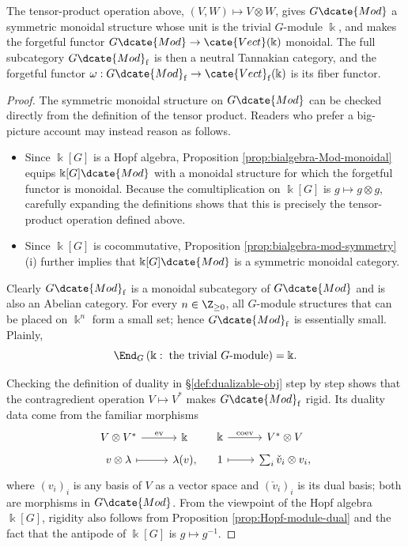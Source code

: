 \begin{proposition}\label{prop:RepG-Tannakian}
	The tensor-product operation above, $(V,W)\mapsto V\otimes W$, gives $G\dcate{Mod}$ a symmetric monoidal structure whose unit is the trivial $G$-module $\Bbbk$, and makes the forgetful functor $G\dcate{Mod}\to\cate{Vect}(\Bbbk)$ monoidal. The full subcategory $G\dcate{Mod}_{\mathrm{f}}$ is then a neutral Tannakian category, and the forgetful functor $\omega:G\dcate{Mod}_{\mathrm{f}}\to\cate{Vect}_{\mathrm{f}}(\Bbbk)$ is its fiber functor.
\end{proposition}
\begin{proof}
	The symmetric monoidal structure on $G\dcate{Mod}$ can be checked directly from the definition of the tensor product. Readers who prefer a big-picture account may instead reason as follows.
	\begin{itemize}
		\item Since $\Bbbk[G]$ is a Hopf algebra, Proposition \ref{prop:bialgebra-Mod-monoidal} equips $\Bbbk[G]\dcate{Mod}$ with a monoidal structure for which the forgetful functor is monoidal. Because the comultiplication on $\Bbbk[G]$ is $g\mapsto g\otimes g$, carefully expanding the definitions shows that this is precisely the tensor-product operation defined above.
		\item Since $\Bbbk[G]$ is cocommutative, Proposition \ref{prop:bialgebra-mod-symmetry} (i) further implies that $\Bbbk[G]\dcate{Mod}$ is a symmetric monoidal category.
	\end{itemize}

	Clearly $G\dcate{Mod}_{\mathrm{f}}$ is a monoidal subcategory of $G\dcate{Mod}$ and is also an Abelian category. For every $n\in\Z_{\geq 0}$, all $G$-module structures that can be placed on $\Bbbk^n$ form a small set; hence $G\dcate{Mod}_{\mathrm{f}}$ is essentially small. Plainly,
	\[ \End_G\left(\Bbbk:\; \text{the trivial $G$-module}\right) = \Bbbk. \]

	Checking the definition of duality in \S\ref{def:dualizable-obj} step by step shows that the contragredient operation $V\mapsto V^*$ makes $G\dcate{Mod}_{\mathrm{f}}$ rigid. Its duality data come from the familiar morphisms
	\[\begin{tikzcd}[row sep=tiny]
		V \otimes V^* \arrow[r, "{\mathrm{ev}}"] & \Bbbk \\
		v \otimes \lambda \arrow[mapsto, r] & \lambda(v),
	\end{tikzcd} \quad \begin{tikzcd}[row sep=tiny]
		\Bbbk \arrow[r, "{\mathrm{coev}}"] & V^* \otimes V \\
		1 \arrow[mapsto, r] & \sum_i \check{v}_i \otimes v_i,
	\end{tikzcd}\]
	where $(v_i)_i$ is any basis of $V$ as a vector space and $(\check v_i)_i$ is its dual basis; both are morphisms in $G\dcate{Mod}$. From the viewpoint of the Hopf algebra $\Bbbk[G]$, rigidity also follows from Proposition \ref{prop:Hopf-module-dual} and the fact that the antipode of $\Bbbk[G]$ is $g\mapsto g^{-1}$.


\end{proof}
